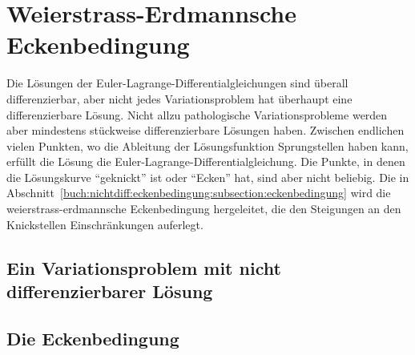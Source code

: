 %
%
%
\section{Weierstrass-Erdmannsche Eckenbedingung
\label{buch:nichtdiff:section:ecken}}
Die Lösungen der Euler-Lagrange-Differentialgleichungen sind überall
differenzierbar, aber nicht jedes Variationsproblem hat überhaupt
eine differenzierbare Lösung.
Nicht allzu pathologische Variationsprobleme werden aber mindestens
stückweise differenzierbare Lösungen haben.
Zwischen endlichen vielen Punkten, wo die Ableitung der Lösungsfunktion
Sprungstellen haben kann, erfüllt die Lösung die
Euler-Lagrange-Differentialgleichung.
Die Punkte, in denen die Lösungskurve ``geknickt'' ist oder ``Ecken''
hat, sind aber nicht beliebig.
Die in Abschnitt~\ref{buch:nichtdiff:eckenbedingung:subsection:eckenbedingung}
wird die weierstrass-erdmannsche Eckenbedingung hergeleitet, die
den Steigungen an den Knickstellen Einschränkungen auferlegt.

%
%
\subsection{Ein Variationsproblem mit nicht differenzierbarer Lösung}

%
%
\subsection{Die Eckenbedingung
\label{buch:nichtdiff:eckenbedingung:subsection:eckenbedingung}}


